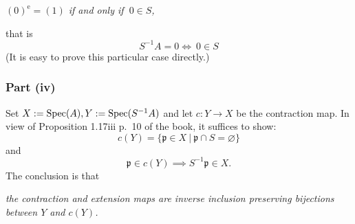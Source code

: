 \documentclass[parskip=half,fontsize=12pt]{scrartcl}%
\newcommand{\oo}{\operatorname}\newcommand{\ooo}{\operatorname*}
\newcommand{\mf}{\mathfrak}
\newcommand{\ppp}{\mf p}
\newcommand{\qqq}{\mf q}
\begin{document}
\emph{$(0)^{\oo e}=(1)$ if and only if $\ 0\in S$,}

that is 
\begin{equation}\label{s-1a}
S^{-1}A=0\iff\ 0\in S
\end{equation}
(It is easy to prove this particular case directly.)

\subsubsection{Part (iv)}\label{prcor}%

Set $X:=\operatorname{Spec}(A),Y:=\operatorname{Spec}(S^{-1}A)$ and let $c:Y\to X$ be the contraction map. In view of Proposition 1.17iii p.~10 of the book, it suffices to show:
$$
c(Y)=\{\ppp\in X\ |\ \ppp\cap S=\varnothing\}
$$ 
and 
$$
\ppp\in c(Y)\implies S^{-1}\ppp\in X.
$$ 
The conclusion is that 

\emph{the contraction and extension maps are inverse inclusion preserving bijections between $Y$ and $c(Y)$.} 

\begin{comment}
\emph{Let $U$ be the set of prime ideals of $A$ disjoint from $S$ and $V$ the set of prime ideals of $S^{-1}A$. Then the maps $U\to V$, $\ppp\mapsto S^{-1}\ppp$ and $V\to U$, $\qqq\mapsto \qqq^{\oo c}$ are well-defined inverse bijections.} 

\emph{Proof.}

$\mf q\in V\implies\mf q^{\oo c}\in U$: It suffices to check that $\mf q^{\oo c}$ is disjoint from $S$. If $s$ is in $S\cap\mf q^{\oo c}$, then $s/1$ is in $\mf q$, which is impossible since $s/1$ is a unit.

$\ppp\in U\implies\ppp^{\oo e}\in V$: As written in the book, ``if $\ppp$ is a prime ideal in $A$, then $A/\ppp$ is an integral domain; if $\overline S$ is the image of $S$ in $A/\ppp$, we have $S^{-1}A/S^{-1}\ppp\simeq\overline S^{-1}(A/\ppp)$ which is either $0$ or else is contained in the field of fractions of $A/\ppp$ and is therefore an integral domain, and therefore $\overline S^{-1}(A/\ppp)$ is either prime or is the unit ideal; by i) the latter possibility occurs if and only if $\ppp$ meets $S$.'' Instead of ``by i)'', I would say ``by \eqref{s-1a}''.

$\ppp^{\oo{ec}}=\ppp$ for $\ppp\in U$: It suffices to show $\ppp^{\oo{ec}}\subset\ppp$. Let $s$ be in $S$. In view of Proposition 3.11 (ii), it suffices to show $(\ppp:s)\subset\ppp$, which is easy.

$\mf q^{\oo{ce}}=\mf q$ for $\mf q\in V$: This is a particular case of Part (i). $\square$
\end{comment}
\end{document}
